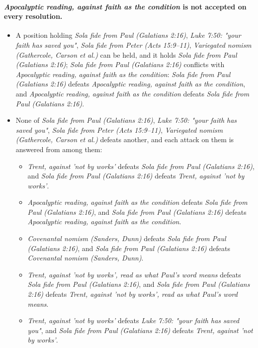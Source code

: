 \documentclass[11pt]{article}
\begin{document}
\paragraph{\emph{Apocalyptic reading, against faith as the condition} is not accepted on every resolution.}
\begin{itemize}
\item A position holding \emph{Sola fide from Paul (Galatians 2:16)}, \emph{Luke 7:50: "your faith has saved you"}, \emph{Sola fide from Peter (Acts 15:9–11)}, \emph{Variegated nomism (Gathercole, Carson et al.)} can be held, and it holds \emph{Sola fide from Paul (Galatians 2:16)}; \emph{Sola fide from Paul (Galatians 2:16)} conflicts with \emph{Apocalyptic reading, against faith as the condition}: \emph{Sola fide from Paul (Galatians 2:16)} defeats \emph{Apocalyptic reading, against faith as the condition}, and \emph{Apocalyptic reading, against faith as the condition} defeats \emph{Sola fide from Paul (Galatians 2:16)}.
\item None of \emph{Sola fide from Paul (Galatians 2:16)}, \emph{Luke 7:50: "your faith has saved you"}, \emph{Sola fide from Peter (Acts 15:9–11)}, \emph{Variegated nomism (Gathercole, Carson et al.)} defeats another, and each attack on them is answered from among them:
\begin{itemize}
\item \emph{Trent, against 'not by works'} defeats \emph{Sola fide from Paul (Galatians 2:16)}, and \emph{Sola fide from Paul (Galatians 2:16)} defeats \emph{Trent, against 'not by works'}.
\item \emph{Apocalyptic reading, against faith as the condition} defeats \emph{Sola fide from Paul (Galatians 2:16)}, and \emph{Sola fide from Paul (Galatians 2:16)} defeats \emph{Apocalyptic reading, against faith as the condition}.
\item \emph{Covenantal nomism (Sanders, Dunn)} defeats \emph{Sola fide from Paul (Galatians 2:16)}, and \emph{Sola fide from Paul (Galatians 2:16)} defeats \emph{Covenantal nomism (Sanders, Dunn)}.
\item \emph{Trent, against 'not by works', read as what Paul's word means} defeats \emph{Sola fide from Paul (Galatians 2:16)}, and \emph{Sola fide from Paul (Galatians 2:16)} defeats \emph{Trent, against 'not by works', read as what Paul's word means}.
\item \emph{Trent, against 'not by works'} defeats \emph{Luke 7:50: "your faith has saved you"}, and \emph{Sola fide from Paul (Galatians 2:16)} defeats \emph{Trent, against 'not by works'}.

\end{itemize}
\end{itemize}
\end{document}
